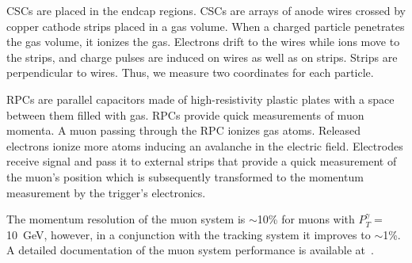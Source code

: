CSCs are placed in the endcap regions. CSCs are arrays of anode wires crossed by copper cathode strips placed in a gas volume. When a charged particle penetrates the gas volume, it ionizes the gas. Electrons drift to the wires while ions move to the strips, and charge pulses are induced on wires as well as on strips. Strips are perpendicular to wires. Thus, we measure two coordinates for each particle.  

RPCs are parallel capacitors made of high-resistivity plastic plates with a space between them filled with gas. RPCs provide quick measurements of muon momenta. A muon passing through the RPC ionizes gas atoms. Released electrons ionize more atoms inducing an avalanche in the electric field. Electrodes receive signal and pass it to external strips that provide a quick measurement of the muon's position which is subsequently transformed to the momentum measurement by the trigger's electronics. 

The momentum resolution of the muon system is $\sim $10\% for muons with $P_T^{\gamma}=$10~GeV, however, in a conjunction with the tracking system it improves to $\sim $1\%. A detailed documentation of the muon system performance is available at~\cite{ref_MuonSystemPerformance}. 



